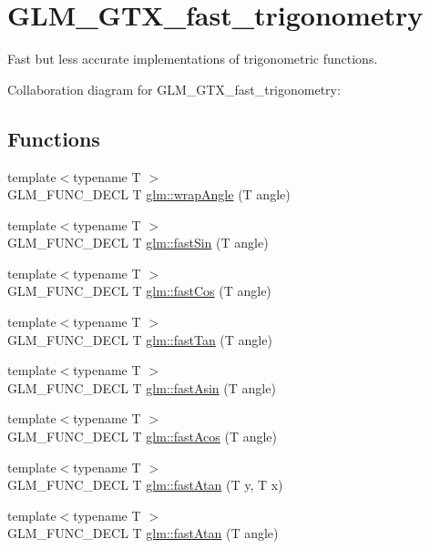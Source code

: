 \hypertarget{group__gtx__fast__trigonometry}{\section{G\-L\-M\-\_\-\-G\-T\-X\-\_\-fast\-\_\-trigonometry}
\label{group__gtx__fast__trigonometry}
}


Fast but less accurate implementations of trigonometric functions.  


Collaboration diagram for G\-L\-M\-\_\-\-G\-T\-X\-\_\-fast\-\_\-trigonometry\-:
\subsection*{Functions}
\begin{DoxyCompactItemize}
\item 
{\footnotesize template$<$typename T $>$ }\\G\-L\-M\-\_\-\-F\-U\-N\-C\-\_\-\-D\-E\-C\-L T \hyperlink{group__gtx__fast__trigonometry_ga069527c6dbd64f53435b8ebc4878b473}{glm\-::wrap\-Angle} (T angle)
\item 
{\footnotesize template$<$typename T $>$ }\\G\-L\-M\-\_\-\-F\-U\-N\-C\-\_\-\-D\-E\-C\-L T \hyperlink{group__gtx__fast__trigonometry_ga0aab3257bb3b628d10a1e0483e2c6915}{glm\-::fast\-Sin} (T angle)
\item 
{\footnotesize template$<$typename T $>$ }\\G\-L\-M\-\_\-\-F\-U\-N\-C\-\_\-\-D\-E\-C\-L T \hyperlink{group__gtx__fast__trigonometry_gab34c8b45c23c0165a64dcecfcc3b302a}{glm\-::fast\-Cos} (T angle)
\item 
{\footnotesize template$<$typename T $>$ }\\G\-L\-M\-\_\-\-F\-U\-N\-C\-\_\-\-D\-E\-C\-L T \hyperlink{group__gtx__fast__trigonometry_gaf29b9c1101a10007b4f79ee89df27ba2}{glm\-::fast\-Tan} (T angle)
\item 
{\footnotesize template$<$typename T $>$ }\\G\-L\-M\-\_\-\-F\-U\-N\-C\-\_\-\-D\-E\-C\-L T \hyperlink{group__gtx__fast__trigonometry_ga562cb62c51fbfe7fac7db0bce706b81f}{glm\-::fast\-Asin} (T angle)
\item 
{\footnotesize template$<$typename T $>$ }\\G\-L\-M\-\_\-\-F\-U\-N\-C\-\_\-\-D\-E\-C\-L T \hyperlink{group__gtx__fast__trigonometry_ga9721d63356e5d94fdc4b393a426ab26b}{glm\-::fast\-Acos} (T angle)
\item 
{\footnotesize template$<$typename T $>$ }\\G\-L\-M\-\_\-\-F\-U\-N\-C\-\_\-\-D\-E\-C\-L T \hyperlink{group__gtx__fast__trigonometry_ga8d197c6ef564f5e5d59af3b3f8adcc2c}{glm\-::fast\-Atan} (T y, T x)
\item 
{\footnotesize template$<$typename T $>$ }\\G\-L\-M\-\_\-\-F\-U\-N\-C\-\_\-\-D\-E\-C\-L T \hyperlink{group__gtx__fast__trigonometry_gae25de86a968490ff56856fa425ec9d30}{glm\-::fast\-Atan} (T angle)
\end{DoxyCompactItemize}


